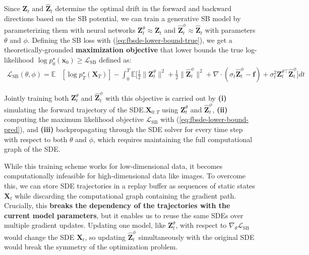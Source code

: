 \documentclass{article}
\begin{document}
Since $\boldsymbol{Z}_t$ and $\widehat{\boldsymbol{Z}}_t$ determine the optimal drift in the forward and backward directions based on the SB potential, we can train a generative SB model by parameterizing them with neural networks $\boldsymbol{Z}^\theta_t\approx \boldsymbol{Z}_t$ and $\widehat{\boldsymbol{Z}}^\phi_t\approx\widehat{\boldsymbol{Z}}_t$ with parameters $\theta$ and $\phi$. Defining the SB loss with (\ref{eq:fbsde-lower-bound-true}), we get a theoretically-grounded \textbf{maximization objective} that lower bounds the true log-likelihood $\log p_0^\star(\boldsymbol{x}_0)\geq \mathcal{L}_{\text{SB}}$ defined as:
\begin{align}
    \mathcal{L}_{\text{SB}}(\theta, \phi)=\mathbb{E}&\left[\log p_T^\star(\boldsymbol{X}_T)\right]-\int_0^T\mathbb{E}\bigg[\frac{1}{2}\|\boldsymbol{Z}^\theta_t\|^2+\frac{1}{2}\|\widehat{\boldsymbol{Z}}^\phi_t\|^2+\nabla\cdot (\sigma_t\widehat{\boldsymbol{Z}}^\phi_t-\boldsymbol{f})+ \sigma_t^2\boldsymbol{Z}^{\theta\top}_t \widehat{\boldsymbol{Z}}^\phi_t\bigg]dt\label{eq:fbsde-lower-bound-pred}
\end{align}

Jointly training both $\boldsymbol{Z}^\theta_t$ and $\widehat{\boldsymbol{Z}}^\phi_t$ with this objective is carried out by \textbf{(i)} simulating the forward trajectory of the SDE.$\boldsymbol{X}_{0:T}$ using $\boldsymbol{Z}_t^\theta$ and $\widehat{\boldsymbol{Z}}_t^\phi$, \textbf{(ii)} computing the maximum likelihood objective $\mathcal{L}_{\text{SB}}$ with (\ref{eq:fbsde-lower-bound-pred}), and \textbf{(iii)} backpropagating through the SDE solver for every time step with respect to both $\theta$ and $\phi$, which requires maintaining the full computational graph of the SDE. 

While this training scheme works for low-dimensional data, it becomes computationally infeasible for high-dimensional data like images. To overcome this, we can store SDE trajectories in a replay buffer as sequences of static states $\boldsymbol{X}_t$ while discarding the computational graph containing the gradient path. Crucially, this \textbf{breaks the dependency of the trajectories with the current model parameters}, but it enables us to reuse the same SDEs over multiple gradient updates. Updating one model, like $\boldsymbol{Z}_t^\theta$, with respect to $\nabla_\theta\mathcal{L}_{\text{SB}}$ would change the SDE $\boldsymbol{X}_t$, so updating $\widehat{\boldsymbol{Z}}_t^\phi$ simultaneously with the original SDE would break the symmetry of the optimization problem. 
\end{document}
